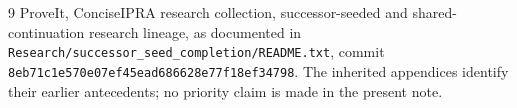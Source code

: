 \documentclass[11pt]{article}
\theoremstyle{definition}\newtheorem{definition}[theorem]{Definition}
\newcommand{\file}[1]{{\small\nolinkurl{#1}}}
\begin{document}
\begin{thebibliography}{9}
ProveIt, ConciseIPRA research collection, successor-seeded and shared-continuation research lineage, as documented in
\file{Research/successor_seed_completion/README.txt},
commit \texttt{8eb71c1e570e07ef45ead686628e77f18ef34798}.
The inherited appendices identify their earlier antecedents; no priority claim is made in the present note.
\end{thebibliography}
\end{document}
